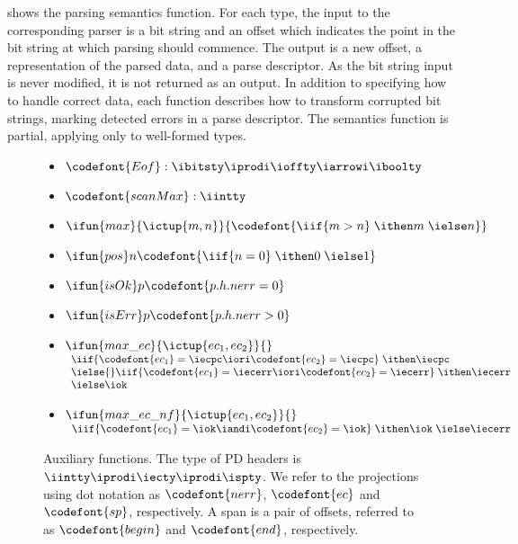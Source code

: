  shows the parsing semantics function.  For each
type, the input to the corresponding parser is a bit string and an
offset which indicates the point in the bit string at which parsing
should commence.  The output is a new offset, a representation of the
parsed data, and a parse descriptor. As the bit string input is
never modified, it is not returned as an output.  In addition
to specifying how to handle correct data, each function describes how
to transform corrupted bit strings, marking detected errors in
a parse descriptor. The semantics function is partial, applying only
to well-formed \ddc{} types.

\begin{figure}
\begin{itemize}
\item[] $\codefont {Eof} : \ibitsty \iprodi \ioffty \iarrowi \iboolty$

\item[] $\codefont{scanMax} : \iintty$

\item[] $\ifun {max} {\ictup{m,n}} {\codefont{\iif {m>n}\; \ithen m\; \ielse n}}$
\item[] $\ifun {pos} n {\codefont{\iif {n=0}\; \ithen 0\; \ielse 1}}$
\item[] $\ifun {isOk} p {\codefont{p.h.nerr = 0}}$
\item[] $\ifun {isErr} p {\codefont{p.h.nerr > 0}}$

\item[] $\ifun {max\_ec} {\ictup{ec_1, ec_2}} {}$ \\
  $\begin{array}{l}
    \iif {\codefont{ec_1} = \iecpc \iori \codefont{ec_2} = \iecpc}\; \ithen \iecpc \\
    \ielse{} \iif {\codefont{ec_1} = \iecerr \iori \codefont{ec_2} = \iecerr}\; \ithen \iecerr \\
    \ielse \iok
   \end{array}$
\item[] $\ifun {max\_ec\_nf} {\ictup{ec_1, ec_2}} {}$ \\
  $\begin{array}{l}
    \iif {\codefont{ec_1} = \iok \iandi \codefont{ec_2} = \iok}\; \ithen \iok\; \ielse \iecerr 
   \end{array}$
\end{itemize}
\caption{Auxiliary functions.  The type of PD headers is $\iintty
  \iprodi \iecty \iprodi \ispty$.  We refer to the projections using
  dot notation as $\codefont{nerr}$, $\codefont{ec}$ and
  $\codefont{sp}$, respectively. A span is a pair of offsets, referred
  to as $\codefont{begin}$ and $\codefont{end}$, respectively.}
\label{fig:aux-funs}
\end{figure}

